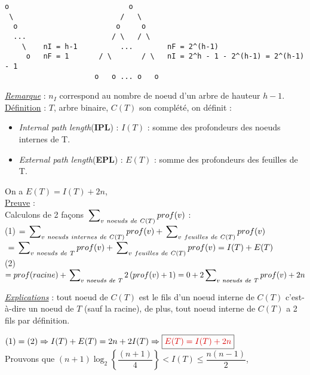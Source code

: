 \documentclass{article}
\begin{document}
\begin{lstlisting}
o                            o
 \                         /   \
  o                       o     o
  ...                    / \   / \
    \    nI = h-1          ...        nF = 2^(h-1) 
     o   nF = 1       / \       / \   nI = 2^h - 1 - 2^(h-1) = 2^(h-1) - 1
                     o   o ... o   o
\end{lstlisting}

\noindent\textit{\underline{Remarque}} : $n_I$ correspond au nombre de noeud d'un arbre de hauteur $h-1$. \\

\noindent\underline{Définition} : $T$, arbre binaire, $C(T)$ son complété, on définit :
\begin{itemize}
\item \textit{Internal path length}(\textbf{IPL}) : $I(T)$ : somme des profondeurs des noeuds internes de T.
\item \textit{External path length}(\textbf{EPL}) : $E(T)$ : somme des profondeurs des feuilles de T.
\end{itemize}

\noindent On a $E(T) = I(T)+2n$, \\

\noindent\underline{Preuve} : \\
Calculons de 2 façons $\sideset{}{_{v\ noeuds\ de\ C(T)}}\sum{prof(v)}$ : \\
(1) $ = \sideset{}{_{v\ noeuds\ internes\ de\ C(T)}}\sum{prof(v)} + \sideset{}{_{v\ feuilles\ de\ 
C(T)}}\sum{prof(v)} $ \\
\indent    $\ = \sideset{}{_{v\ noeuds\ de\ T}}\sum{prof(v)} + \sideset{}{_{v\ feuilles\ de\ C(T)}}\sum{prof(v)} 
= I(T)+E(T)$ \\
(2) $ = prof(racine) + \sideset{}{_{v\ noeuds\ de\ T}}\sum{2\left(prof(v)+1\right)} = 0 + 2
\sideset{}{_{v\ noeuds\ de\ T}}\sum{prof(v)} + 2n$

\noindent\underline{\textit{Explications}} : tout noeud de $C(T)$ est le fils d'un noeud interne de $C(T)$ c'est-
à-dire un noeud de $T$ (sauf la racine), de plus, tout noeud interne de $C(T)$ a 2 fils par définition.

\noindent $(1)=(2)\Rightarrow I(T)+E(T) = 2n+2I(T) \Rightarrow \boxed{\textcolor{darkred}{E(T) = I(T) + 2n}}$ \\

Prouvons que $(n+1) \log_2\left\{\dfrac{(n+1)}{4}\right\} < I(T) \leq \dfrac{n(n-1)}{2}$, \\
\end{document}
